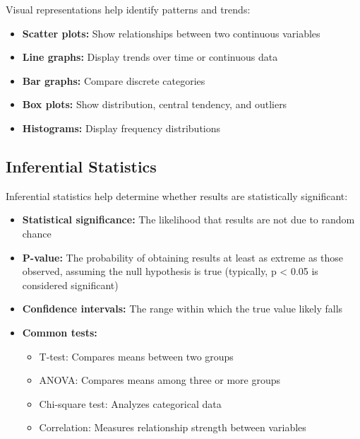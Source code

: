 \documentclass[justified,notoc]{tufte-book}
\begin{document}
Visual representations help identify patterns and trends:

\begin{itemize}
    \item \textbf{Scatter plots:} Show relationships between two continuous variables
    \item \textbf{Line graphs:} Display trends over time or continuous data
    \item \textbf{Bar graphs:} Compare discrete categories
    \item \textbf{Box plots:} Show distribution, central tendency, and outliers
    \item \textbf{Histograms:} Display frequency distributions
\end{itemize}

    \centering

\subsection{Inferential Statistics}

Inferential statistics help determine whether results are statistically significant:

\begin{itemize}
    \item \textbf{Statistical significance:} The likelihood that results are not due to random chance
    
    \item \textbf{P-value:} The probability of obtaining results at least as extreme as those observed, assuming the null hypothesis is true (typically, p < 0.05 is considered significant)
    
    \item \textbf{Confidence intervals:} The range within which the true value likely falls
    
    \item \textbf{Common tests:}
    \begin{itemize}
        \item T-test: Compares means between two groups
        \item ANOVA: Compares means among three or more groups
        \item Chi-square test: Analyzes categorical data
        \item Correlation: Measures relationship strength between variables
    \end{itemize}
\end{itemize}
\end{document}
